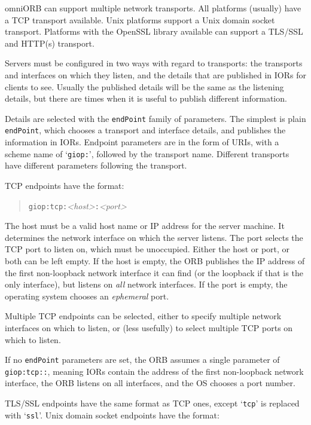 \documentclass[11pt,oneside,a4paper]{book}
\newcommand{\code}[1]{\texttt{#1}}
\newcommand{\term}[1]{\textit{#1}}
\begin{document}
omniORB can support multiple network transports. All platforms
(usually) have a TCP transport available. Unix platforms support a
Unix domain socket transport. Platforms with the OpenSSL library
available can support a TLS/SSL and HTTP(s) transport.

Servers must be configured in two ways with regard to transports: the
transports and interfaces on which they listen, and the details that
are published in IORs for clients to see. Usually the published
details will be the same as the listening details, but there are times
when it is useful to publish different information.

Details are selected with the \code{endPoint} family of parameters.
The simplest is plain \code{endPoint}, which chooses a transport and
interface details, and publishes the information in IORs. Endpoint
parameters are in the form of URIs, with a scheme name of
`\code{giop:}', followed by the transport name. Different transports
have different parameters following the transport.

TCP endpoints have the format:

\begin{quote}
\code{giop:tcp:}\textit{<host>}\code{:}\textit{<port>}
\end{quote}

\noindent The host must be a valid host name or IP address for the
server machine.  It determines the network interface on which the
server listens. The port selects the TCP port to listen on, which must
be unoccupied.  Either the host or port, or both can be left empty. If
the host is empty, the ORB publishes the IP address of the first
non-loopback network interface it can find (or the loopback if that is
the only interface), but listens on \emph{all} network interfaces. If
the port is empty, the operating system chooses an \term{ephemeral}
port.

Multiple TCP endpoints can be selected, either to specify multiple
network interfaces on which to listen, or (less usefully) to select
multiple TCP ports on which to listen.

If no \code{endPoint} parameters are set, the ORB assumes a single
parameter of \code{giop:tcp::}, meaning IORs contain the address of
the first non-loopback network interface, the ORB listens on all
interfaces, and the OS chooses a port number.

TLS/SSL endpoints have the same format as TCP ones, except
`\code{tcp}' is replaced with `\code{ssl}'. Unix domain socket
endpoints have the format:
\end{document}
